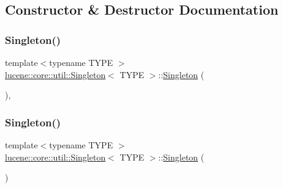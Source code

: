 \subsection{Constructor \& Destructor Documentation}
\mbox{\label{classlucene_1_1core_1_1util_1_1Singleton_a53448fc36821fec1c97716535987eaa7}} 
\subsubsection{\texorpdfstring{Singleton()}{Singleton()}\hspace{0.1cm}{\footnotesize\ttfamily [1/2]}}
{\footnotesize\ttfamily template$<$typename T\+Y\+PE $>$ \\
\mbox{\hyperlink{classlucene_1_1core_1_1util_1_1Singleton}{lucene\+::core\+::util\+::\+Singleton}}$<$ T\+Y\+PE $>$\+::\mbox{\hyperlink{classlucene_1_1core_1_1util_1_1Singleton}{Singleton}} (\begin{DoxyParamCaption}{ }\end{DoxyParamCaption})\hspace{0.3cm}{\ttfamily [inline]}, {\ttfamily [private]}}

\mbox{\label{classlucene_1_1core_1_1util_1_1Singleton_ab5733f8687076b2ce608b096f91f5237}} 
\subsubsection{\texorpdfstring{Singleton()}{Singleton()}\hspace{0.1cm}{\footnotesize\ttfamily [2/2]}}
{\footnotesize\ttfamily template$<$typename T\+Y\+PE $>$ \\
\mbox{\hyperlink{classlucene_1_1core_1_1util_1_1Singleton}{lucene\+::core\+::util\+::\+Singleton}}$<$ T\+Y\+PE $>$\+::\mbox{\hyperlink{classlucene_1_1core_1_1util_1_1Singleton}{Singleton}} (\begin{DoxyParamCaption}\item[{\mbox{\hyperlink{ZlibCrc32_8h_a2c212835823e3c54a8ab6d95c652660e}{const}} \mbox{\hyperlink{classlucene_1_1core_1_1util_1_1Singleton}{Singleton}}$<$ T\+Y\+PE $>$ \&}]{ }\end{DoxyParamCaption})\hspace{0.3cm}{\ttfamily [delete]}}



